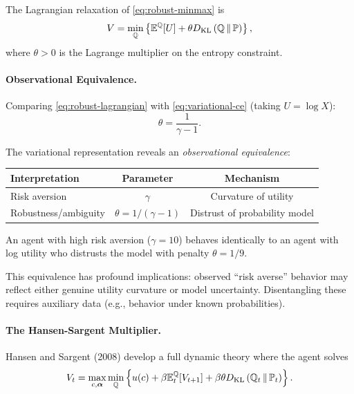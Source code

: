 The Lagrangian relaxation of \eqref{eq:robust-minmax} is
\begin{equation}
V = \min_{\mathbb{Q}} \left\{ \mathbb{E}^{\mathbb{Q}}[U] + \theta D_{\mathrm{KL}}\left(\mathbb{Q} \,\|\, \mathbb{P}\right) \right\},
\label{eq:robust-lagrangian}
\end{equation}
where $\theta > 0$ is the Lagrange multiplier on the entropy constraint.

\paragraph{Observational Equivalence.}

Comparing \eqref{eq:robust-lagrangian} with \eqref{eq:variational-ce} (taking $U = \log X$):
\begin{equation}
\theta = \frac{1}{\gamma - 1}.
\label{eq:theta-gamma}
\end{equation}

\begin{calloutimportant}
The variational representation reveals an \emph{observational equivalence}:
\begin{center}
\begin{tabular}{@{}lcc@{}}
\toprule
\textbf{Interpretation} & \textbf{Parameter} & \textbf{Mechanism} \\
\midrule
Risk aversion & $\gamma$ & Curvature of utility \\
Robustness/ambiguity & $\theta = 1/(\gamma-1)$ & Distrust of probability model \\
\bottomrule
\end{tabular}
\end{center}

An agent with high risk aversion ($\gamma = 10$) behaves identically to an agent with log utility who distrusts the model with penalty $\theta = 1/9$.

This equivalence has profound implications: observed ``risk averse'' behavior may reflect either genuine utility curvature or model uncertainty. Disentangling these requires auxiliary data (e.g., behavior under known probabilities).
\end{calloutimportant}

\paragraph{The Hansen-Sargent Multiplier.}

Hansen and Sargent (2008) develop a full dynamic theory where the agent solves
\begin{equation}
V_t = \max_{c, \boldsymbol{\alpha}} \min_{\mathbb{Q}} \left\{ u(c) + \beta \mathbb{E}_t^{\mathbb{Q}}[V_{t+1}] + \beta \theta D_{\mathrm{KL}}\left(\mathbb{Q}_t \,\|\, \mathbb{P}_t\right) \right\}.
\label{eq:hs-bellman}
\end{equation}

